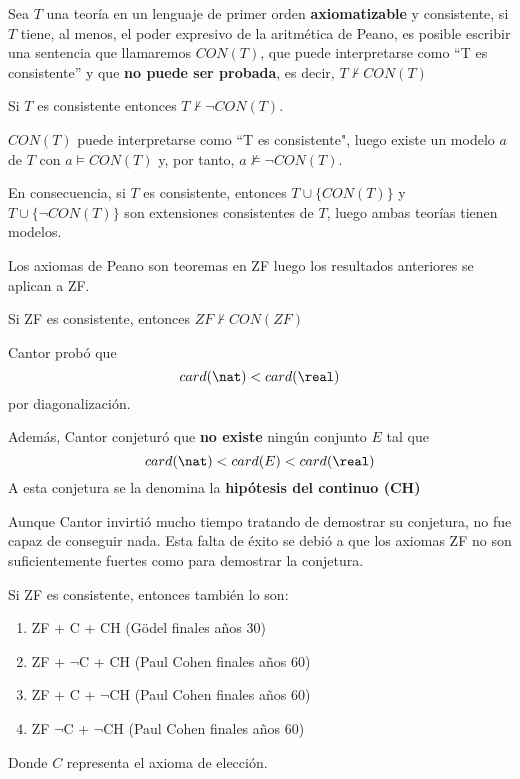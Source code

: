 \begin{theorem}
Sea $T$ una teoría en un lenguaje de primer orden \textbf{axiomatizable} y consistente, si $T$ tiene, al menos, el poder expresivo de la aritmética de Peano, es posible escribir una sentencia que llamaremos $CON(T)$, que puede interpretarse como ``T es consistente'' y que \textbf{no puede ser probada}, es decir, $T \nvdash CON(T)$
\end{theorem}

\begin{obs}
Si $T$ es consistente entonces $T \nvdash \neg CON(T)$.

$CON(T)$ puede interpretarse como ``T es consistente", luego existe un modelo $a$ de $T$ con $a \vDash CON(T)$ y, por tanto, $a \nvDash \neg CON(T)$.

En consecuencia, si $T$ es consistente, entonces $T \cup \{ CON(T)\}$ y $T\cup \{\neg CON(T)\}$ son extensiones consistentes de $T$, luego ambas teorías tienen modelos.

\end{obs}

\begin{obs}
Los axiomas de Peano son teoremas en ZF luego los resultados anteriores se aplican a ZF.
\end{obs}

\begin{theorem}
Si ZF es consistente, entonces $ZF \nvdash CON(ZF)$
\end{theorem}

\begin{theorem} 
Cantor probó que 
\[card(\nat) < card(\real)\]
por diagonalización.

Además, Cantor conjeturó que \textbf{no existe} ningún conjunto $E$ tal que
\[card(\nat) < card(E) < card(\real)\]
A esta conjetura se la denomina la \textbf{hipótesis del continuo (CH)}
\end{theorem}

Aunque Cantor invirtió mucho tiempo tratando de demostrar su conjetura, no fue capaz de conseguir nada. Esta falta de éxito se debió a que los axiomas ZF no son suficientemente fuertes como para demostrar la conjetura.

\begin{theorem}
Si ZF es consistente, entonces también lo son:
\begin{enumerate}
\item ZF + C + CH (Gödel finales años 30)
\item ZF + $\neg$C + CH (Paul Cohen finales años 60)
\item ZF + C + $\neg$CH (Paul Cohen finales años 60)
\item ZF $\neg$C + $\neg$CH (Paul Cohen finales años 60)
\end{enumerate}

Donde $C$ representa el axioma de elección.
\end{theorem}

